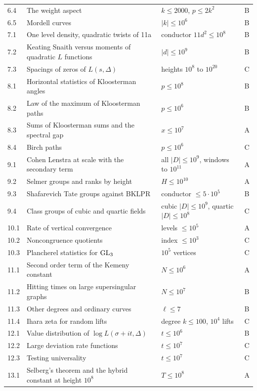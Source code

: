 {\begin{longtable}{p{0.9cm}p{5.3cm}p{3.0cm}p{0.5cm}}
6.4 & The weight aspect & $k\le2000$, $p\le2k^2$ & B\\
6.5 & Mordell curves & $|k|\le10^6$ & B\\
7.1 & One level density, quadratic twists of 11a & conductor $11d^2\le 10^8$ & B\\
7.2 & Keating Snaith versus moments of quadratic $L$ functions & $|d| \le 10^9$ & B\\
7.3 & Spacings of zeros of $L(s,\Delta)$ & heights $10^8$ to $10^{20}$ & C\\
8.1 & Horizontal statistics of Kloosterman angles & $p \le 10^8$ & B\\
8.2 & Law of the maximum of Kloosterman paths & $p \le 10^6$ & B\\
8.3 & Sums of Kloosterman sums and the spectral gap & $x \le 10^7$ & A\\
8.4 & Birch paths & $p \le 10^6$ & C\\
9.1 & Cohen Lenstra at scale with the secondary term & all $|D|\le 10^9$, windows to $10^{11}$ & A\\
9.2 & Selmer groups and ranks by height & $H \le 10^{10}$ & A\\
9.3 & Shafarevich Tate groups against BKLPR & conductor $\le 5\cdot10^5$ & B\\
9.4 & Class groups of cubic and quartic fields & cubic $|D|\le10^9$, quartic $|D|\le10^8$ & C\\
10.1 & Rate of vertical convergence & levels $\le 10^5$ & A\\
10.2 & Noncongruence quotients & index $\le 10^3$ & C\\
10.3 & Plancherel statistics for $\mathrm{GL}_3$ & $10^5$ vertices & C\\
11.1 & Second order term of the Kemeny constant & $N \le 10^6$ & A\\
11.2 & Hitting times on large supersingular graphs & $N \le 10^7$ & B\\
11.3 & Other degrees and ordinary curves & $\ell \le 7$ & B\\
11.4 & Ihara zeta for random lifts & degree $k\le 100$, $10^4$ lifts & C\\
12.1 & Value distribution of $\log L(\sigma+it,\Delta)$ & $t \le 10^6$ & B\\
12.2 & Large deviation rate functions & $t \le 10^7$ & C\\
12.3 & Testing universality & $t \le 10^7$ & C\\
13.1 & Selberg's theorem and the hybrid constant at height $10^8$ & $T\le 10^8$ & A\\

\end{longtable}}
